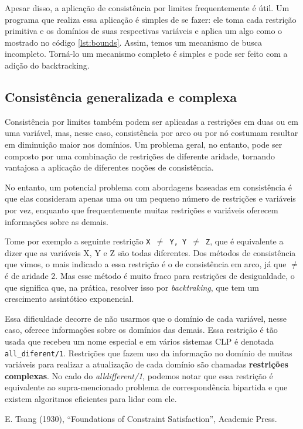 \documentclass{article}
\begin{document}
Apesar disso, a aplicação de consistência por limites frequentemente é útil. Um programa que realiza essa aplicação é simples
de se fazer: ele toma cada restrição primitiva e os domínios de suas respectivas variáveis e aplica um algo como o mostrado no
código \ref{lst:bounds}. Assim, temos um mecanismo de busca incompleto. Torná-lo um mecanismo completo é simples e pode ser feito
com a adição do backtracking.


\subsection{Consistência generalizada e complexa}

Consistência por limites também podem ser aplicadas a restrições em duas ou em uma variável, mas, nesse caso, consistência por
arco ou por nó costumam resultar em diminuição maior nos domínios. Um problema geral, no entanto, pode ser composto por uma
combinação de restrições de diferente aridade, tornando vantajosa a aplicação de diferentes noções de consistência.

No entanto, um potencial problema com abordagens baseadas em consistência é que elas consideram apenas uma ou um pequeno número de
restrições e variáveis por vez, enquanto que frequentemente muitas restrições e variáveis oferecem informações sobre as demais.

Tome por exemplo a seguinte restrição {\tt X $\neq$ Y, Y $\neq$ Z}, que é equivalente a dizer que as variáveis X, Y e Z são todas
diferentes. Dos métodos de consistência que vimos, o mais indicado a essa restrição é o de consistência em arco, já que $\neq$ é
de aridade 2. Mas esse método é muito fraco para restrições de desigualdade, o que significa que, na prática, resolver isso
por \textit{backtraking}, que tem um crescimento assintótico exponencial.%

Essa dificuldade decorre de não usarmos que o domínio de cada variável, nesse caso, oferece informações sobre os domínios das
demais. Essa restrição é tão usada que recebeu um nome especial e em vários sistemas CLP é denotada {\tt all\_diferent/1}.
Restrições que fazem uso da informação no domínio de muitas variáveis para realizar a atualização de cada domínio são
chamadas \textbf{restrições complexas}. No cado do \textit{alldifferent/1}, podemos notar que essa restrição é equivalente ao
supra-mencionado problema de correspondência bipartida e que existem algoritmos eficientes para lidar com ele.






  \begin{thebibliography}{1}

      E. Tsang (1930), ``Foundations of Constraint Satisfaction'', Academic Press.

  \end{thebibliography}
\end{document}
